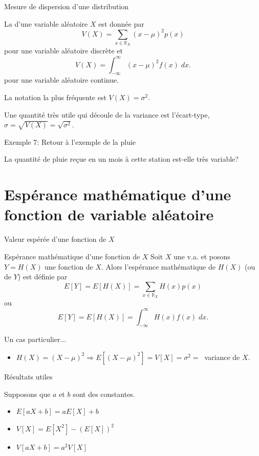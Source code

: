 \documentclass{BeamerTemplate}
\begin{document}
\begin{frame}[t]{Mesure de dispersion d'une distribution}

\begin{defn}
La  d'une variable aléatoire $X$ est donnée par
  $$V(X)=\sum_{x\in \mathbb{R}_X} (x-\mu)^2p(x)$$
pour une variable aléatoire discrète et
  $$V(X)=\int_{-\infty}^\infty (x-\mu)^2f(x)\;dx.$$
pour une variable aléatoire continue.
\end{defn}
La notation la plus fréquente est $V(X)= \sigma^2$.

Une quantité très utile qui découle de la variance est l'écart-type, $\sigma = \sqrt{V(X)}=\sqrt{\sigma^2}$.

\end{frame}


\begin{frame}[t]{Exemple 7: Retour à l'exemple de la pluie}

La quantité de pluie reçue en un mois à cette station est-elle très variable?
\end{frame}

\section{Espérance mathématique d'une fonction de variable aléatoire}

\begin{frame}[t]{Valeur espérée d'une fonction de $X$}

{\small
\begin{Boite}{Espérance mathématique d'une fonction de $X$}
 Soit $X$ une v.a. et posons $Y=H(X)$ une fonction
 de $X$. Alors l'\alert{espérance mathématique
 de $H(X)$} (ou de $Y$) est définie par
 $$E[Y]=E[H(X)]=\sum_{x\in\mathbb{R}_X}H(x)p(x)$$
 ou
 $$E[Y]=E[H(X)]=\int_{-\infty}^\infty H(x)f(x)\;dx.$$
\end{Boite}
Un cas particulier...
\begin{itemize}
 \item $H(X)=(X-\mu)^2\Rightarrow E[(X-\mu)^2]=V[X]=\sigma^2=\;\;$variance de $X$.
\end{itemize}
}
\end{frame}

\begin{frame}[t]{Résultats utiles}

Supposons que $a$ et $b$ sont des constantes.

\begin{itemize}
\item<1-> $E[aX+b]=aE[X]+b$\ \ \ \ \

\vspace{0.45in}

\item<1-> $V[X]=E[X^2]-(E[X])^2$\ \ \ \ \

\vspace{0.75in}

\item<1-> $V[aX+b]=a^2V[X]$\ \ \ \ \
\end{itemize}
\end{frame}
\end{document}
